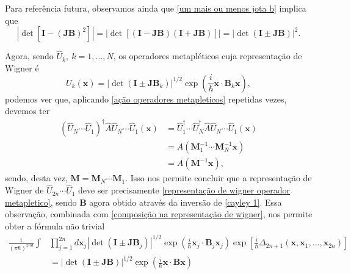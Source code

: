 \documentclass[
	12pt,
	oneside,			%
	a4paper,			%
	english,			%
	brazil				%
	]{abntex2}
\theoremstyle{definition}
\begin{document}
Para referência futura, observamos ainda que \eqref{um mais ou menos jota b} implica que
\begin{equation}
\label{relação determinante}
    \left|\det \left[ \mathbf{I} - \left( \mathbf{JB} \right)^2 \right] \right| = \left| \det \left[ \left( \mathbf{I}- \mathbf{JB} \right)\left( \mathbf{I}+ \mathbf{JB} \right) \right] \right| = \left| \det\left( \mathbf{I} \pm \mathbf{JB} \right) \right|^2.
\end{equation}

Agora, sendo $\hat{U}_k, \ k=1,\ldots,N$, os operadores metapléticos cuja representação de Wigner é
\begin{equation}
    U_k(\mathbf{x}) = \left| \det \left( \mathbf{I} \pm \mathbf{JB}_k \right) \right|^{1/2} \exp \left( \frac{i}{\hbar} \mathbf{x} \cdot \mathbf{B}_k \mathbf{x} \right),
\end{equation}
podemos ver que, aplicando \eqref{ação operadores metapleticos} repetidas vezes, devemos ter
\begin{equation}
    \begin{aligned}
        \left( \hat{U}_N \cdots \hat{U}_1 \right)^\dagger \hat{A} \hat{U}_N \cdots \hat{U}_1 (\mathbf{x}) &= \hat{U}_1^\dagger \cdots \hat{U}_N^\dagger \hat{A} \hat{U}_N \cdots \hat{U}_1(\mathbf{x}) \\ &= A \left( \mathbf{M}_1^{-1} \cdots \mathbf{M}_N^{-1} \mathbf{x} \right) \\ &= A \left(\mathbf{M}^{-1}\mathbf{x} \right),
    \end{aligned}
\end{equation}
sendo, desta vez, $\mathbf{M} = \mathbf{M}_N \cdots \mathbf{M}_1$. Isso nos permite concluir que a representação de Wigner de $\hat{U}_{2n} \cdots \hat{U}_1$ deve ser precisamente \eqref{representação de wigner operador metapletico}, sendo $\mathbf{B}$ agora obtido através da inversão de \eqref{cayley 1}. Essa observação, combinada com \eqref{composição na representação de wigner}, nos permite obter a fórmula não trivial
\begin{equation}
\label{composição metapletica}
    \begin{aligned}
        \frac{1}{\left(\pi \hbar\right)^{2nd}} \int&  \prod_{j=1}^{2n} d\mathbf{x}_j \left| \det \left( \mathbf{I} \pm \mathbf{JB}_j \right) \right|^{1/2} \exp \left( \frac{i}{\hbar} \mathbf{x}_j \cdot \mathbf{B}_j \mathbf{x}_j \right) \exp\left[\frac{i}{\hbar}\Delta_{2n+1} \left(\mathbf{x},\mathbf{x}_1,\ldots,\mathbf{x}_{2n}\right)\right] \\ &= \left| \det \left( \mathbf{I} \pm \mathbf{JB} \right) \right|^{1/2} \exp \left( \frac{i}{\hbar} \mathbf{x} \cdot \mathbf{B} \mathbf{x} \right)
    \end{aligned}
\end{equation}
\end{document}
